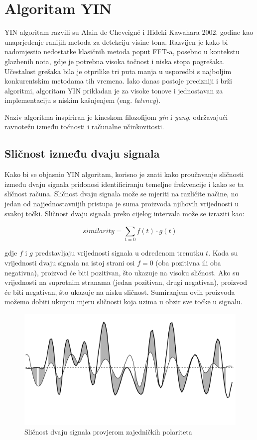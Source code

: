 \documentclass[times, utf8, diplomski, numeric]{fer}
\begin{document}
\chapter{Algoritam YIN}
%
YIN algoritam razvili su Alain de Cheveigné i Hideki Kawahara 2002. godine kao unaprjeđenje ranijih metoda za detekciju visine tona. Razvijen je kako bi nadomjestio nedostatke klasičnih metoda poput FFT-a, posebno u kontekstu glazbenih nota, gdje je potrebna visoka točnost i niska stopa pogrešaka. Učestalost grešaka bila je otprilike tri puta manja u usporedbi s najboljim konkurentskim metodama tih vremena. Iako danas postoje precizniji i brži algoritmi, algoritam YIN prikladan je za visoke tonove i jednostavan za implementaciju s niskim kašnjenjem (eng. \textit{latency}).\cite{de2002yin}

Naziv algoritma inspiriran je kineskom filozofijom \textit{yin} i \textit{yang}, održavajući ravnotežu između točnosti i računalne učinkovitosti.

\section{Sličnost između dvaju signala}
%
Kako bi se objasnio YIN algoritam, korisno je znati kako proučavanje sličnosti između dvaju signala pridonosi identificiranju temeljne frekvencije i kako se ta sličnost računa. Sličnost dvaju signala može se mjeriti na različite načine, no jedan od najjednostavnijih pristupa je suma proizvoda njihovih vrijednosti u svakoj točki. Sličnost dvaju signala preko cijelog intervala može se izraziti kao:

\begin{equation}
	similarity = \sum_{t = 0}^{} {f(t) \cdot g(t)}
\end{equation}

gdje $f$ i $g$ predstavljaju vrijednosti signala u određenom trenutku $t$. Kada su vrijednosti dvaju signala na istoj strani osi $f = 0$ (oba pozitivna ili oba negativna), proizvod će biti pozitivan, što ukazuje na visoku sličnost. Ako su vrijednosti na suprotnim stranama (jedan pozitivan, drugi negativan), proizvod će biti negativan, što ukazuje na nisku sličnost. Sumiranjem ovih proizvoda možemo dobiti ukupnu mjeru sličnosti koja uzima u obzir sve točke u signalu.

\begin{figure}[H]
	\centerline{\includegraphics[width=1.0\textwidth]{similarity.png}}
	\caption{Sličnost dvaju signala provjerom zajedničkih polariteta}
	\label{fig}
\end{figure}
\end{document}
